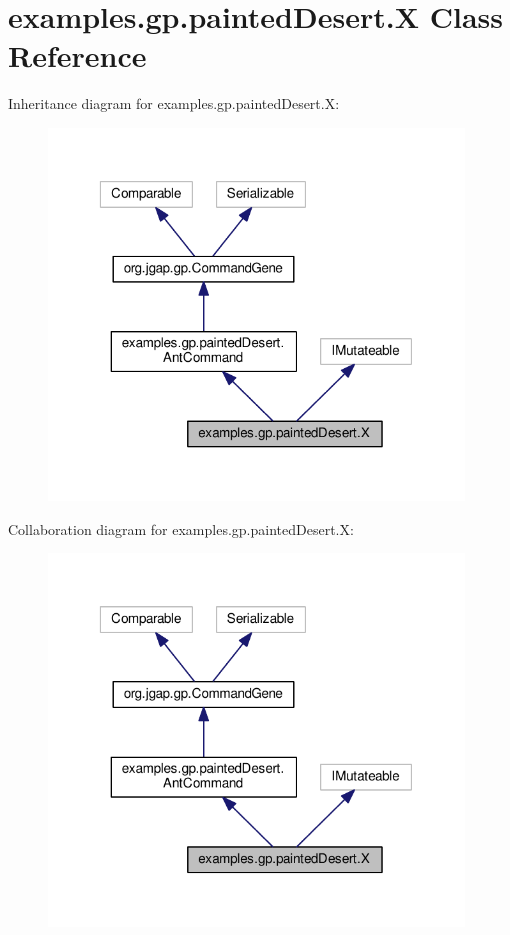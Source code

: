 \hypertarget{classexamples_1_1gp_1_1painted_desert_1_1_x}{\section{examples.\-gp.\-painted\-Desert.\-X Class Reference}
\label{classexamples_1_1gp_1_1painted_desert_1_1_x}
}


Inheritance diagram for examples.\-gp.\-painted\-Desert.\-X\-:
\nopagebreak
\begin{figure}[H]
\begin{center}
\leavevmode
\includegraphics[width=313pt]{classexamples_1_1gp_1_1painted_desert_1_1_x__inherit__graph}
\end{center}
\end{figure}


Collaboration diagram for examples.\-gp.\-painted\-Desert.\-X\-:
\nopagebreak
\begin{figure}[H]
\begin{center}
\leavevmode
\includegraphics[width=313pt]{classexamples_1_1gp_1_1painted_desert_1_1_x__coll__graph}
\end{center}
\end{figure}
